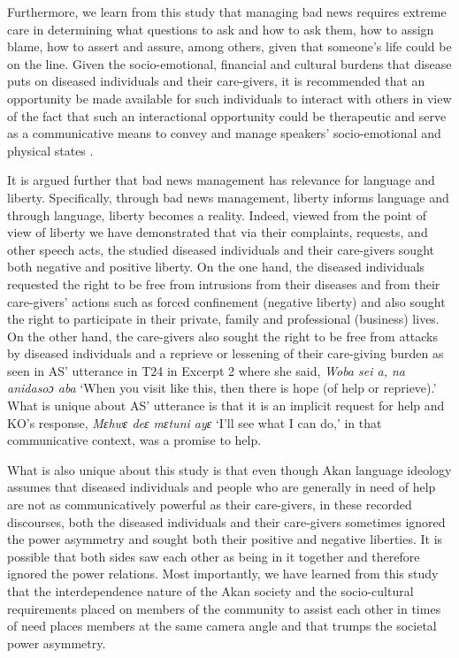 \documentclass[output=paper,colorlinks,citecolor=brown]{langscibook}
\begin{document}
Furthermore, we learn from this study that managing bad news requires extreme care in determining what questions to ask and how to ask them, how to assign blame, how to assert and assure, among others, given that someone’s life could be on the line. Given the socio-emotional, financial and cultural burdens that disease puts on diseased individuals and their care-givers, it is recommended that an opportunity be made available for such individuals to interact with others in view of the fact that such an interactional opportunity could be therapeutic and serve as a communicative means to convey and manage speakers’ socio-emotional and physical states \citep{KalmykovaMergenthaler1998}.

It is argued further that bad news management has relevance for language and liberty. Specifically, through bad news management, liberty informs language and through language, liberty becomes a reality. Indeed, viewed from the point of view of liberty \citep{Berlin1960} we have demonstrated that via their complaints, requests, and other speech acts, the studied diseased individuals and their care-givers sought both negative and positive liberty. On the one hand, the diseased individuals requested the right to be free from intrusions from their diseases and from their care-givers’ actions such as forced confinement (negative liberty) and also sought the right to participate in their private, family and professional (business) lives. On the other hand, the care-givers also sought the right to be free from attacks by diseased individuals and a reprieve or lessening of their care-giving burden as seen in AS’ utterance in T24 in Excerpt 2 where she said, \textit{Woba sei a, na anidasoɔ aba} ‘When you visit like this, then there is hope (of help or reprieve).’ What is unique about AS’ utterance is that it is an implicit request for help and KO’s response, \textit{Mɛhwɛ deɛ mɛtuni ayɛ} ‘I’ll see what I can do,’ in that communicative context, was a promise to help. 

What is also unique about this study is that even though Akan language ideology assumes that diseased individuals and people who are generally in need of help are not as communicatively powerful as their care-givers, in these recorded discourses, both the diseased individuals and their care-givers sometimes ignored the power asymmetry and sought both their positive and negative liberties. It is possible that both sides saw each other as being in it together and therefore ignored the power relations. Most importantly, we have learned from this study that the interdependence nature of the Akan society and the socio-cultural requirements placed on members of the community to assist each other in times of need places members at the same camera angle and that trumps the societal power asymmetry. 
\end{document}
